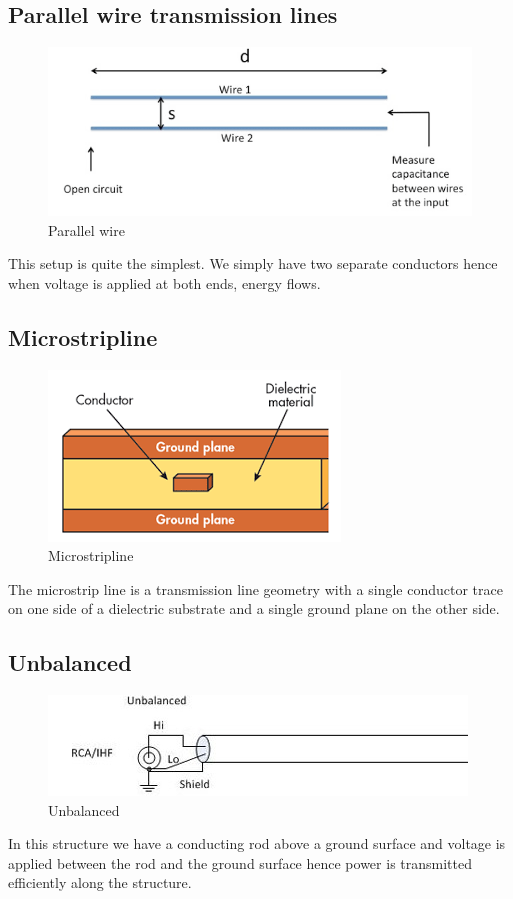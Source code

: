 \subsection{Parallel wire transmission lines}
 \begin{figure}[h]
\centering
\includegraphics[scale=0.4]{./graphics/twowire}
\caption{Parallel wire}
\end{figure}
This setup is quite the simplest. We simply have two separate conductors hence when voltage is applied at both ends, energy flows.
\subsection{Microstripline}
\begin{figure}[h]
\centering
\includegraphics[scale=0.7]{./graphics/micro}
\caption{Microstripline }
\end{figure}
The microstrip line is a transmission line geometry with a single conductor trace on one side of a dielectric substrate and a single ground plane on the other side.
\subsection{Unbalanced}
\begin{figure}[h]
\centering
\includegraphics[width=1\linewidth]{./graphics/Unbalanced}
\caption{ Unbalanced }
\end{figure}
 In this structure we have a conducting rod above a ground surface and voltage is applied between the rod and the ground surface hence power is transmitted efficiently along the structure.
